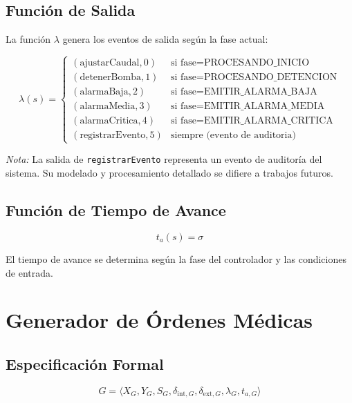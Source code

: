 \documentclass[12pt,a4paper,oneside]{report}
\begin{document}
\subsection{Función de Salida}

La función $\lambda$ genera los eventos de salida según la fase actual:

\[
\lambda(s) = \begin{cases}
(\text{ajustarCaudal}, 0) & \text{si } \text{fase} = \text{PROCESANDO\_INICIO} \\
(\text{detenerBomba}, 1) & \text{si } \text{fase} = \text{PROCESANDO\_DETENCION} \\
(\text{alarmaBaja}, 2) & \text{si } \text{fase} = \text{EMITIR\_ALARMA\_BAJA} \\
(\text{alarmaMedia}, 3) & \text{si } \text{fase} = \text{EMITIR\_ALARMA\_MEDIA} \\
(\text{alarmaCritica}, 4) & \text{si } \text{fase} = \text{EMITIR\_ALARMA\_CRITICA} \\
(\text{registrarEvento}, 5) & \text{siempre (evento de auditoria)}
\end{cases}
\]

\textit{Nota:} La salida de \texttt{registrarEvento} representa un evento de auditoría del sistema. Su modelado y procesamiento detallado se difiere a trabajos futuros.

\subsection{Función de Tiempo de Avance}

\[
t_a(s) = \sigma
\]

El tiempo de avance se determina según la fase del controlador y las condiciones de entrada.

\newpage

\section{Generador de Órdenes Médicas}

\subsection{Especificación Formal}

\[
G = \langle X_G, Y_G, S_G, \delta_{\text{int},G}, \delta_{\text{ext},G}, \lambda_G, t_{a,G} \rangle
\]
\end{document}
